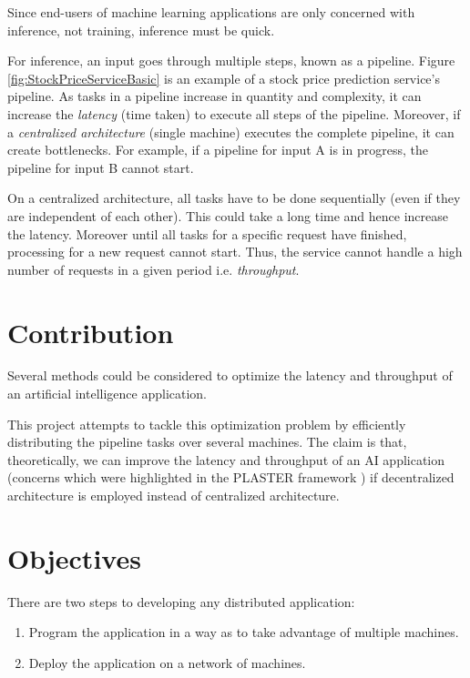 \documentclass{report}
\begin{document}
Since end-users of machine learning applications are only concerned with inference, not training, inference must be quick.

For inference, an input goes through multiple steps, known as a pipeline. Figure \ref{fig:StockPriceServiceBasic} is an example of a stock price prediction service's pipeline. As tasks in a pipeline increase in quantity and complexity, it can increase the \textit{latency} (time taken) to execute all steps of the pipeline. Moreover, if a \textit{centralized architecture} (single machine) executes the complete pipeline, it can create bottlenecks. For example, if a pipeline for input A is in progress, the pipeline for input B cannot start.

On a centralized architecture, all tasks have to be done sequentially (even if they are independent of each other). This could take a long time and hence increase the latency. Moreover until all tasks for a specific request have finished, processing for a new request cannot start. Thus, the service cannot handle a high number of requests in a given period i.e. \textit{throughput}.

\section{Contribution}\label{contribution}

Several methods could be considered to optimize the latency and throughput of an artificial intelligence application.

This project attempts to tackle this optimization problem by efficiently distributing the pipeline tasks over several machines. The claim is that, theoretically, we can improve the latency and throughput of an AI application (concerns which were highlighted in the PLASTER framework \cite{Teich2018}) if decentralized architecture is employed instead of centralized architecture.

\section{Objectives}\label{objectives}

There are two steps to developing any distributed application:
\begin{enumerate}
  \item Program the application in a way as to take advantage of multiple machines.
  \item Deploy the application on a network of machines.
\end{enumerate}
\end{document}
